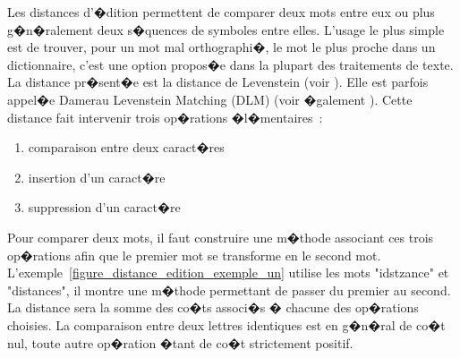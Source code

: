 
\firstpassagedo{}

\firstpassagedo{}



\label{edit_distance_annexe}

Les distances d'�dition permettent de comparer deux mots entre eux ou plus g�n�ralement deux s�quences de symboles entre elles. L'usage le plus simple est de trouver, pour un mot mal orthographi�, le mot le plus proche dans un dictionnaire, c'est une option propos�e dans la plupart des traitements de texte. La distance pr�sent�e est la distance de Levenstein (voir ). Elle est parfois appel�e Damerau Levenstein Matching (DLM) (voir �galement ). Cette distance fait intervenir trois op�rations �l�mentaires~:

    \begin{enumerate}
    \item comparaison entre deux caract�res
    \item insertion d'un caract�re
    \item suppression d'un caract�re
    \end{enumerate}

Pour comparer deux mots, il faut construire une m�thode associant ces trois op�rations afin que le premier mot se transforme en le second mot. L'exemple~\ref{figure_distance_edition_exemple_un} utilise les mots "idstzance" et "distances", il montre une m�thode permettant de passer du premier au second. La distance sera la somme des co�ts associ�s � chacune des op�rations choisies. La comparaison entre deux lettres identiques est en g�n�ral de co�t nul, toute autre op�ration �tant de co�t strictement positif. 


